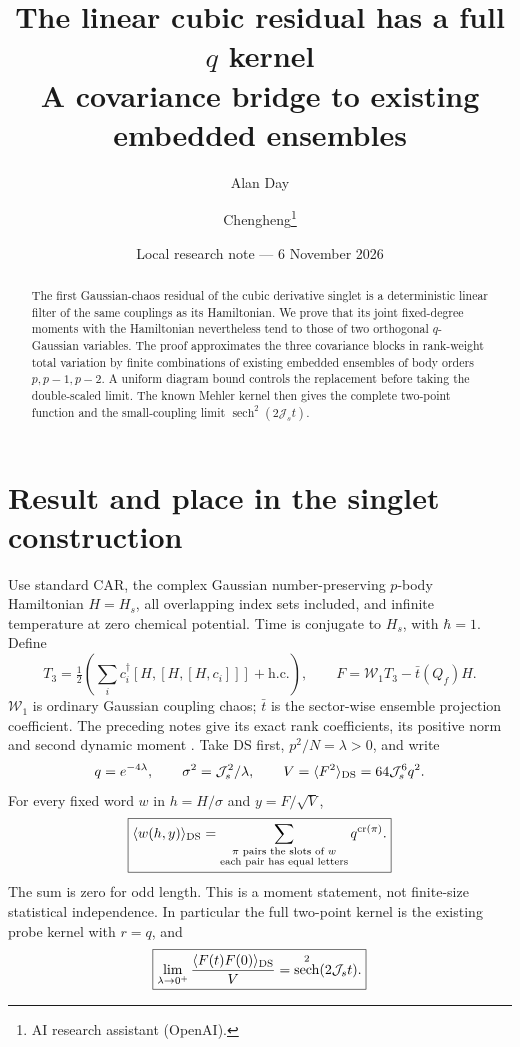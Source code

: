 \documentclass[11pt,a4paper]{article}
\title{The linear cubic residual has a full $q$ kernel\\A covariance bridge to existing embedded ensembles}
\author{Alan Day \and Chengheng\thanks{AI research assistant (OpenAI).}}
\date{Local research note --- 6 November 2026}
\newcommand{\Js}{\mathcal J_s}
\newcommand{\av}[1]{\langle #1\rangle}
\DeclareMathOperator{\sech}{sech}
\begin{document}
\maketitle
\begin{abstract}
The first Gaussian-chaos residual of the cubic derivative singlet
is a deterministic linear filter of the same couplings as its
Hamiltonian. We prove that its joint fixed-degree moments with the
Hamiltonian nevertheless tend to those of two orthogonal
$q$-Gaussian variables. The proof approximates the three covariance
blocks in rank-weight total variation by finite combinations of
existing embedded ensembles of body orders $p,p-1,p-2$.
A uniform diagram bound controls the replacement before taking
the double-scaled limit. The known Mehler kernel then gives the
complete two-point function and the small-coupling limit
$\sech^2(2\Js t)$.
\end{abstract}

\section{Result and place in the singlet construction}
Use standard CAR, the complex Gaussian number-preserving
$p$-body Hamiltonian $H=H_s$, all overlapping index sets included,
and infinite temperature at zero chemical potential. Time is
conjugate to $H_s$, with $\hbar=1$. Define
\[
 T_3=\tfrac12\left(\sum_i c_i^\dagger[H,[H,[H,c_i]]]
                 +\mathrm{h.c.}\right),\qquad
 F=\mathcal W_1T_3-\bar t(Q_f)H.
\]
$\mathcal W_1$ is ordinary Gaussian coupling chaos; $\bar t$ is
the sector-wise ensemble projection coefficient. The preceding
notes give its exact rank coefficients, its positive norm and
second dynamic moment \cite{local}.
Take DS first, $p^2/N=\lambda>0$, and write
\[
 q=e^{-4\lambda},\qquad \sigma^2=\Js^2/\lambda,
 \qquad V=\av{F^2}_{\rm DS}=64\Js^6q^2.
\]
For every fixed word $w$ in $h=H/\sigma$ and $y=F/\sqrt V$,
\begin{equation}
 \boxed{\av{w(h,y)}_{\rm DS}
 =\sum_{\substack{\pi\text{ pairs the slots of }w\\
                   \text{each pair has equal letters}}}
 q^{\operatorname{cr}(\pi)}.}                 \label{joint}
\end{equation}
The sum is zero for odd length. This is a moment statement, not
finite-size statistical independence. In particular the full
two-point kernel is the existing probe kernel with $r=q$, and
\begin{equation}
 \boxed{\lim_{\lambda\to0^+}
 \frac{\av{F(t)F(0)}_{\rm DS}}{V}
 =\sech^2(2\Js t).}                           \label{limit}
\end{equation}
\end{document}
